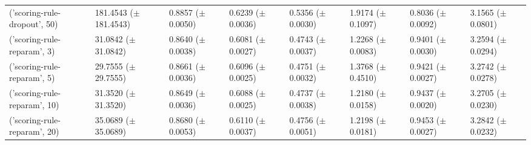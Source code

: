 \begin{tabular}{llllllll}
('scoring-rule-dropout', 50) & \makecell{181.4543 \\ ($\pm$ 181.4543)} & \makecell{0.8857 \\ ($\pm$ 0.0050)} & \makecell{0.6239 \\ ($\pm$ 0.0036)} & \makecell{0.5356 \\ ($\pm$ 0.0030)} & \makecell{1.9174 \\ ($\pm$ 0.1097)} & \makecell{0.8036 \\ ($\pm$ 0.0092)} & \makecell{3.1565 \\ ($\pm$ 0.0801)} \\
('scoring-rule-reparam', 3) & \makecell{31.0842 \\ ($\pm$ 31.0842)} & \makecell{0.8640 \\ ($\pm$ 0.0038)} & \makecell{0.6081 \\ ($\pm$ 0.0027)} & \makecell{0.4743 \\ ($\pm$ 0.0037)} & \makecell{1.2268 \\ ($\pm$ 0.0083)} & \makecell{0.9401 \\ ($\pm$ 0.0030)} & \makecell{3.2594 \\ ($\pm$ 0.0294)} \\
('scoring-rule-reparam', 5) & \makecell{29.7555 \\ ($\pm$ 29.7555)} & \makecell{0.8661 \\ ($\pm$ 0.0036)} & \makecell{0.6096 \\ ($\pm$ 0.0025)} & \makecell{0.4751 \\ ($\pm$ 0.0032)} & \makecell{1.3768 \\ ($\pm$ 0.4510)} & \makecell{0.9421 \\ ($\pm$ 0.0027)} & \makecell{3.2742 \\ ($\pm$ 0.0278)} \\
('scoring-rule-reparam', 10) & \makecell{31.3520 \\ ($\pm$ 31.3520)} & \makecell{0.8649 \\ ($\pm$ 0.0036)} & \makecell{0.6088 \\ ($\pm$ 0.0025)} & \makecell{0.4737 \\ ($\pm$ 0.0038)} & \makecell{1.2180 \\ ($\pm$ 0.0158)} & \makecell{0.9437 \\ ($\pm$ 0.0020)} & \makecell{3.2705 \\ ($\pm$ 0.0230)} \\
('scoring-rule-reparam', 20) & \makecell{35.0689 \\ ($\pm$ 35.0689)} & \makecell{0.8680 \\ ($\pm$ 0.0053)} & \makecell{0.6110 \\ ($\pm$ 0.0037)} & \makecell{0.4756 \\ ($\pm$ 0.0051)} & \makecell{1.2198 \\ ($\pm$ 0.0181)} & \makecell{0.9453 \\ ($\pm$ 0.0027)} & \makecell{3.2842 \\ ($\pm$ 0.0232)} \\

\end{tabular}
